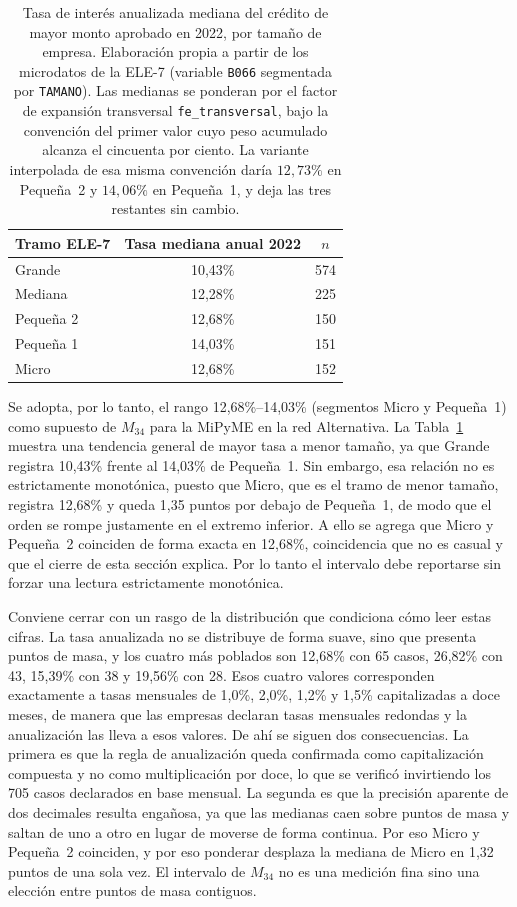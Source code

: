 \begin{table}[htbp]
\centering
\caption[Tasa de interés mediana anual 2022 por tamaño de empresa (ELE-7)]{Tasa de interés anualizada mediana del crédito de mayor monto aprobado en 2022, por tamaño de empresa. Elaboración propia a partir de los microdatos de la ELE-7 \cite{ele7_microdatos_2024} (variable \texttt{B066} segmentada por \texttt{TAMANO}). Las medianas se ponderan por el factor de expansión transversal \texttt{fe\_transversal}, bajo la convención del primer valor cuyo peso acumulado alcanza el cincuenta por ciento. La variante interpolada de esa misma convención daría $12{,}73\%$ en Pequeña~2 y $14{,}06\%$ en Pequeña~1, y deja las tres restantes sin cambio.}
\label{tab:ele7-tasas}
\begin{tabular}{lcc}
\hline
Tramo ELE-7 & Tasa mediana anual 2022 & $n$ \\
\hline
Grande      & 10,43\% & 574 \\
Mediana     & 12,28\% & 225 \\
Pequeña 2   & 12,68\% & 150 \\
Pequeña 1   & 14,03\% & 151 \\
Micro       & 12,68\% & 152 \\
\hline
\end{tabular}
\end{table}

Se adopta, por lo tanto, el rango 12,68\%--14,03\% (segmentos Micro y Pequeña~1) como supuesto de $M_{34}$ para la MiPyME en la red Alternativa. La Tabla~\ref{tab:ele7-tasas} muestra una tendencia general de mayor tasa a menor tamaño, ya que Grande registra 10,43\% frente al 14,03\% de Pequeña~1. Sin embargo, esa relación no es estrictamente monotónica, puesto que Micro, que es el tramo de menor tamaño, registra 12,68\% y queda 1,35 puntos por debajo de Pequeña~1, de modo que el orden se rompe justamente en el extremo inferior. A ello se agrega que Micro y Pequeña~2 coinciden de forma exacta en 12,68\%, coincidencia que no es casual y que el cierre de esta sección explica. Por lo tanto el intervalo debe reportarse sin forzar una lectura estrictamente monotónica.

Conviene cerrar con un rasgo de la distribución que condiciona cómo leer estas cifras. La tasa anualizada no se distribuye de forma suave, sino que presenta puntos de masa, y los cuatro más poblados son 12,68\% con 65 casos, 26,82\% con 43, 15,39\% con 38 y 19,56\% con 28. Esos cuatro valores corresponden exactamente a tasas mensuales de 1,0\%, 2,0\%, 1,2\% y 1,5\% capitalizadas a doce meses, de manera que las empresas declaran tasas mensuales redondas y la anualización las lleva a esos valores. De ahí se siguen dos consecuencias. La primera es que la regla de anualización queda confirmada como capitalización compuesta y no como multiplicación por doce, lo que se verificó invirtiendo los 705 casos declarados en base mensual. La segunda es que la precisión aparente de dos decimales resulta engañosa, ya que las medianas caen sobre puntos de masa y saltan de uno a otro en lugar de moverse de forma continua. Por eso Micro y Pequeña~2 coinciden, y por eso ponderar desplaza la mediana de Micro en 1,32 puntos de una sola vez. El intervalo de $M_{34}$ no es una medición fina sino una elección entre puntos de masa contiguos.

